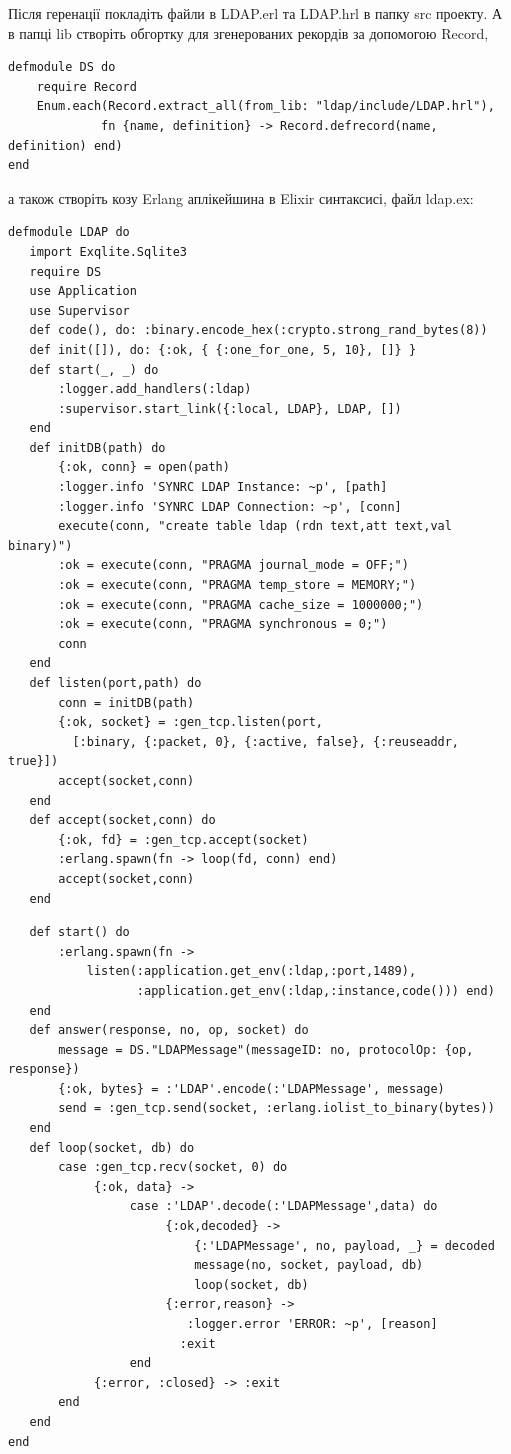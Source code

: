 Після геренації покладіть файли в LDAP.erl та LDAP.hrl в папку src проекту. А в папці lib створіть обгортку для згенерованих рекордів за допомогою Record,

\begin{lstlisting}
defmodule DS do
    require Record
    Enum.each(Record.extract_all(from_lib: "ldap/include/LDAP.hrl"),
             fn {name, definition} -> Record.defrecord(name, definition) end)
end
\end{lstlisting}

а також створіть козу Erlang аплікейшина в Elixir синтаксисі, файл ldap.ex:

\begin{lstlisting}
defmodule LDAP do
   import Exqlite.Sqlite3
   require DS
   use Application
   use Supervisor
   def code(), do: :binary.encode_hex(:crypto.strong_rand_bytes(8))
   def init([]), do: {:ok, { {:one_for_one, 5, 10}, []} }
   def start(_, _) do
       :logger.add_handlers(:ldap)
       :supervisor.start_link({:local, LDAP}, LDAP, [])
   end
   def initDB(path) do
       {:ok, conn} = open(path)
       :logger.info 'SYNRC LDAP Instance: ~p', [path]
       :logger.info 'SYNRC LDAP Connection: ~p', [conn]
       execute(conn, "create table ldap (rdn text,att text,val binary)")
       :ok = execute(conn, "PRAGMA journal_mode = OFF;")
       :ok = execute(conn, "PRAGMA temp_store = MEMORY;")
       :ok = execute(conn, "PRAGMA cache_size = 1000000;")
       :ok = execute(conn, "PRAGMA synchronous = 0;")
       conn
   end
   def listen(port,path) do
       conn = initDB(path)
       {:ok, socket} = :gen_tcp.listen(port,
         [:binary, {:packet, 0}, {:active, false}, {:reuseaddr, true}])
       accept(socket,conn)
   end
   def accept(socket,conn) do
       {:ok, fd} = :gen_tcp.accept(socket)
       :erlang.spawn(fn -> loop(fd, conn) end)
       accept(socket,conn)
   end
\end{lstlisting}

\begin{lstlisting}
   def start() do
       :erlang.spawn(fn ->
           listen(:application.get_env(:ldap,:port,1489),
                  :application.get_env(:ldap,:instance,code())) end)
   end
   def answer(response, no, op, socket) do
       message = DS."LDAPMessage"(messageID: no, protocolOp: {op, response})
       {:ok, bytes} = :'LDAP'.encode(:'LDAPMessage', message)
       send = :gen_tcp.send(socket, :erlang.iolist_to_binary(bytes))
   end
   def loop(socket, db) do
       case :gen_tcp.recv(socket, 0) do
            {:ok, data} ->
                 case :'LDAP'.decode(:'LDAPMessage',data) do
                      {:ok,decoded} ->
                          {:'LDAPMessage', no, payload, _} = decoded
                          message(no, socket, payload, db)
                          loop(socket, db)
                      {:error,reason} ->
                         :logger.error 'ERROR: ~p', [reason]
                        :exit
                 end
            {:error, :closed} -> :exit
       end
   end
end
\end{lstlisting}

